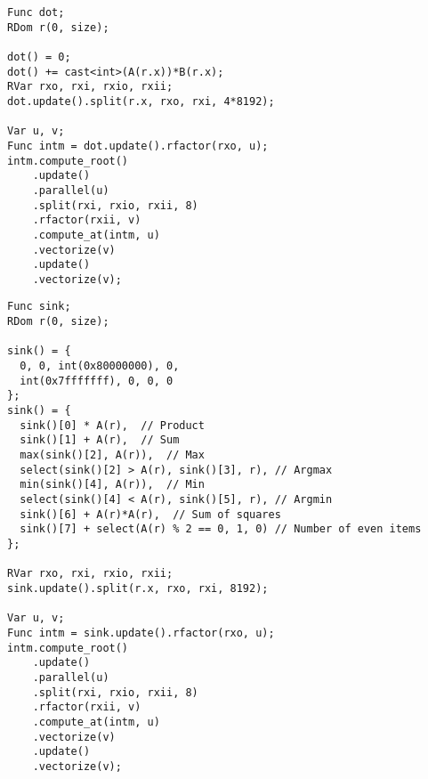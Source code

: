 \begin{lstlisting}[caption={Benchmark code for dot product}, label={lst:benchmark_dot_product}]
Func dot;
RDom r(0, size);

dot() = 0;
dot() += cast<int>(A(r.x))*B(r.x);
RVar rxo, rxi, rxio, rxii;
dot.update().split(r.x, rxo, rxi, 4*8192);

Var u, v;
Func intm = dot.update().rfactor(rxo, u);
intm.compute_root()
    .update()
    .parallel(u)
    .split(rxi, rxio, rxii, 8)
    .rfactor(rxii, v)
    .compute_at(intm, u)
    .vectorize(v)
    .update()
    .vectorize(v);
\end{lstlisting}

\begin{lstlisting}[caption={Benchmark code for kitchen sink.}, label={lst:benchmark_kitchen_sink}]
Func sink;
RDom r(0, size);

sink() = {
  0, 0, int(0x80000000), 0, 
  int(0x7fffffff), 0, 0, 0
};
sink() = {
  sink()[0] * A(r),  // Product
  sink()[1] + A(r),  // Sum
  max(sink()[2], A(r)),  // Max
  select(sink()[2] > A(r), sink()[3], r), // Argmax
  min(sink()[4], A(r)),  // Min
  select(sink()[4] < A(r), sink()[5], r), // Argmin
  sink()[6] + A(r)*A(r),  // Sum of squares
  sink()[7] + select(A(r) % 2 == 0, 1, 0) // Number of even items
};

RVar rxo, rxi, rxio, rxii;
sink.update().split(r.x, rxo, rxi, 8192);

Var u, v;
Func intm = sink.update().rfactor(rxo, u);
intm.compute_root()
    .update()
    .parallel(u)
    .split(rxi, rxio, rxii, 8)
    .rfactor(rxii, v)
    .compute_at(intm, u)
    .vectorize(v)
    .update()
    .vectorize(v);
\end{lstlisting}
